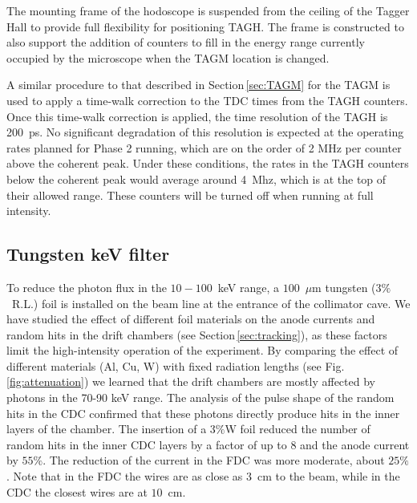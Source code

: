 The mounting frame of the hodoscope is suspended from the ceiling of the Tagger Hall
to provide full flexibility for positioning TAGH. The frame is constructed
to also support the addition of counters to fill in the energy range currently
occupied by the microscope when the TAGM location is changed.

A similar procedure to that described in Section\,\ref{sec:TAGM} for the TAGM is used to apply
a time-walk correction to the TDC times from the TAGH counters. Once this
time-walk correction
is applied, the time resolution of the TAGH is 200~ps. No significant
degradation of this resolution is expected at the operating rates planned
for Phase 2 running, which are on the order of 2 MHz per counter above
the coherent peak. Under these conditions, the rates in the TAGH counters
below the coherent peak would average around 4~Mhz, which is at the top
of their allowed range. These counters will be turned off when
running at full intensity.

\subsection{Tungsten keV filter}

To reduce the photon flux in the $10-100$~keV range, a $100$~$\mu$m tungsten ($3\%$~R.L.) foil is installed on the beam line at the entrance of the collimator cave.  We have studied the effect of different foil materials on the anode currents and  random hits in the drift chambers (see Section\,\ref{sec:tracking}), as these factors limit the high-intensity operation of the experiment. By comparing the effect of different materials (Al, Cu, W) with fixed radiation lengths (see Fig.\ref{fig:attenuation})  we learned that the drift chambers are mostly affected by photons in the 70-90 keV range. The analysis of the pulse shape  of the random hits in the CDC confirmed that these photons directly produce hits in the inner layers of the chamber. The insertion of a  $3\%$W foil reduced the number of random hits in the inner CDC layers by a factor of up to 8 and the anode current by $55\%$. The reduction of the current in the FDC was more moderate, about $25\%$. Note that in the FDC the wires are as close as $3$~cm to the beam, while in the CDC the closest wires are at $10$~cm.

